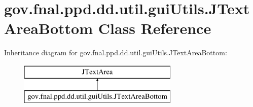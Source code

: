 \hypertarget{classgov_1_1fnal_1_1ppd_1_1dd_1_1util_1_1guiUtils_1_1JTextAreaBottom}{\section{gov.\-fnal.\-ppd.\-dd.\-util.\-gui\-Utils.\-J\-Text\-Area\-Bottom Class Reference}
\label{classgov_1_1fnal_1_1ppd_1_1dd_1_1util_1_1guiUtils_1_1JTextAreaBottom}
}
Inheritance diagram for gov.\-fnal.\-ppd.\-dd.\-util.\-gui\-Utils.\-J\-Text\-Area\-Bottom\-:\begin{figure}[H]
\begin{center}
\leavevmode
\includegraphics[height=2.000000cm]{classgov_1_1fnal_1_1ppd_1_1dd_1_1util_1_1guiUtils_1_1JTextAreaBottom}
\end{center}
\end{figure}
